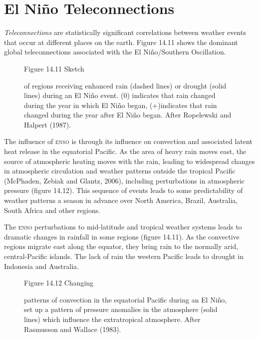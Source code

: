 \section{El Ni\~{n}o Teleconnections}
\textit{Teleconnections} are statistically significant
correlations between weather e\-vents that occur at different places
on the earth. Figure 14.11 shows the dominant global teleconnections
associated with the El Ni\~{n}o/Southern Oscillation.

\begin{figure}[t!]
\footnotesize
Figure 14.11 Sketch \rule{0pt}{4ex}of regions receiving enhanced rain
(dashed lines) or drought (solid lines) during an El Ni\~{n}o
event. (0) indicates that rain changed during the year in which El
Ni\~{n}o began, (+)indicates that rain changed during the year after
El Ni\~{n}o began. After Ropelewski and Halpert (1987).
\label{fig:teleconnections}
\vspace{-4ex}
\end{figure}

The influence of \textsc{enso} is through its influence on convection
and associated latent heat release in the equatorial Pacific. As the
area of heavy rain moves east, the source of atmospheric heating moves
with the rain, leading to widespread changes in atmospheric
circulation and weather patterns outside the tropical Pacific
(McPhaden, Zebiak and Glantz, 2006), including perturbations in
atmospheric pressure (figure 14.12). This sequence of events leads to
some predictability of weather patterns a season in advance over North
America, Brazil, Australia, South Africa and other regions.

The \textsc{enso} perturbations to mid-latitude and tropical weather
systems leads to dramatic changes in rainfall in some regions (figure 14.11). As the convective regions
migrate east along the equator, they bring rain to the normally arid,
central-Pacific islands. The lack of rain the western Pacific leads to
drought in Indonesia and Australia.
\begin{figure}[h!]
\vspace{-2ex}
\footnotesize
Figure 14.12 Changing \rule{0pt}{4ex}patterns of convection in the
equatorial Pacific during an El Ni\~{n}o, set up a pattern of pressure
anomalies in the atmosphere
(solid lines) which influence the extratropical atmosphere. After
Rasmusson and Wallace (1983).
\label{fig:pressureanomaly}
\vspace{-3ex}
\end{figure}

